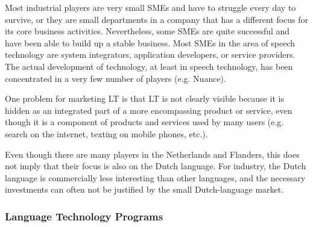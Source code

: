 \documentclass[]{../../metanetpaper}
\begin{document}
\begin{multicols}{2}
    Most industrial players are very small SMEs and have to struggle every day to survive, or they are small departments in a company that has a different focus for its core business activities. Nevertheless, some SMEs are quite successful and have been able to build up a stable business. Most SMEs in the area of speech technology are system integrators, application developers, or service providers. The actual development of technology, at least in speech technology, has been concentrated in a very few number of players (e.g. Nuance).

    One problem for marketing LT is that LT is not clearly visible because it is hidden as an integrated part of a more encompassing product or service, even though it is a component of products and services used by many users (e.g. search on the internet, texting on mobile phones, etc.).

    Even though there are many players in the Netherlands and Flanders, this does not imply that their focus is also on the Dutch language. For industry, the Dutch language is commercially less interesting than other languages, and the necessary investments can often not be justified by the small Dutch-language market.

\subsubsection{Language Technology Programs}


\end{multicols}
\end{document}
